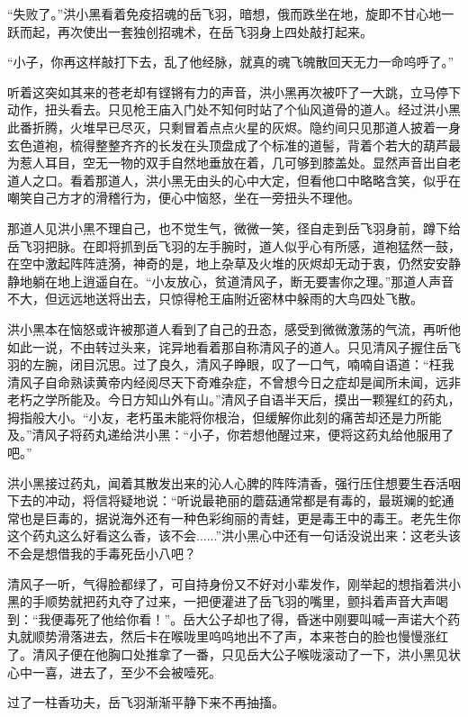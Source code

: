 “失败了。”洪小黑看着免疫招魂的岳飞羽，暗想，俄而跌坐在地，旋即不甘心地一跃而起，再次使出一套独创招魂术，在岳飞羽身上四处敲打起来。

“小子，你再这样敲打下去，乱了他经脉，就真的魂飞魄散回天无力一命呜呼了。”

听着这突如其来的苍老却有铿锵有力的声音，洪小黑再次被吓了一大跳，立马停下动作，扭头看去。只见枪王庙入门处不知何时站了个仙风道骨的道人。经过洪小黑此番折腾，火堆早已尽灭，只剩冒着点点火星的灰烬。隐约间只见那道人披着一身玄色道袍，梳得整整齐齐的长发在头顶盘成了个标准的道髻，背着个若大的葫芦最为惹人耳目，空无一物的双手自然地垂放在着，几可够到膝盖处。显然声音出自老道人之口。看着那道人，洪小黑无由头的心中大定，但看他口中略略含笑，似乎在嘲笑自己方才的滑稽行为，便心中恼怒，坐在一旁扭头不理他。

那道人见洪小黑不理自己，也不觉生气，微微一笑，径自走到岳飞羽身前，蹲下给岳飞羽把脉。在即将抓到岳飞羽的左手腕时，道人似乎心有所感，道袍猛然一鼓，在空中激起阵阵涟漪，神奇的是，地上杂草及火堆的灰烬却无动于衷，仍然安安静静地躺在地上逍遥自在。“小友放心，贫道清风子，断无要害你之理。”那道人声音不大，但远远地送将出去，只惊得枪王庙附近密林中躲雨的大鸟四处飞散。

洪小黑本在恼怒或许被那道人看到了自己的丑态，感受到微微激荡的气流，再听他如此一说，不由转过头来，诧异地看着那自称清风子的道人。只见清风子握住岳飞羽的左腕，闭目沉思。过了良久，清风子睁眼，叹了一口气，喃喃自语道：“枉我清风子自命熟读黄帝内经阅尽天下奇难杂症，不曾想今日之症却是闻所未闻，远非老朽之学所能及。今日方知山外有山。”清风子自语半天后，摸出一颗猩红的药丸，拇指般大小。“小友，老朽虽未能将你根治，但缓解你此刻的痛苦却还是力所能及。”清风子将药丸递给洪小黑：“小子，你若想他醒过来，便将这药丸给他服用了吧。”

洪小黑接过药丸，闻着其散发出来的沁人心脾的阵阵清香，强行压住想要生吞活咽下去的冲动，将信将疑地说：“听说最艳丽的蘑菇通常都是有毒的，最斑斓的蛇通常也是巨毒的，据说海外还有一种色彩绚丽的青蛙，更是毒王中的毒王。老先生你这个药丸这么好看这么香，该不会......”洪小黑心中还有一句话没说出来：这老头该不会是想借我的手毒死岳小八吧？

清风子一听，气得脸都绿了，可自持身份又不好对小辈发作，刚举起的想指着洪小黑的手顺势就把药丸夺了过来，一把便灌进了岳飞羽的嘴里，颤抖着声音大声喝到：“我便毒死了他给你看！”。岳大公子却也了得，昏迷中刚要叫喊一声诺大个药丸就顺势滑落进去，然后卡在喉咙里呜呜地出不了声，本来苍白的脸也慢慢涨红了。清风子便在他胸口处推拿了一番，只见岳大公子喉咙滚动了一下，洪小黑见状心中一喜，进去了，至少不会被噎死。

过了一柱香功夫，岳飞羽渐渐平静下来不再抽搐。

